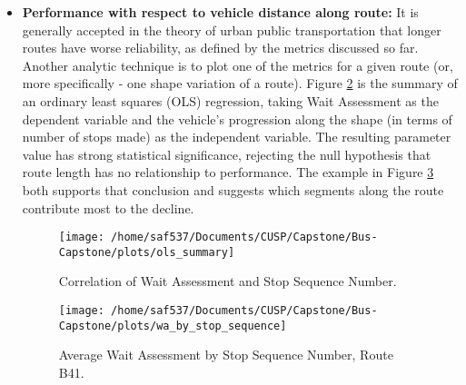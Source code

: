 \documentclass[12pt,journal,compsoc]{IEEEtran}
\begin{document}
\begin{itemize}
One example descriptive analysis is to plot the distribution of normalized running time variances. Visible in this example, Figure \ref{adh}, is both the central tendency -- slightly positive -- and the wide spread of the distribution, indicating very inconsistent running time adherence.  Strategies to reduce the inconsistency are not in the scope of this project.




\begin{figure}[!ht]
  \caption{Running time adherence.}
  \label{adh}
  \centering
    \texttt{[image: /home/saf537/Documents/CUSP/Capstone/Bus-Capstone/plots/running\_time\_adherence]}
\end{figure}


\item \textbf{Performance with respect to vehicle distance along route:} It is generally accepted in the theory of urban public transportation that longer routes have worse reliability, as defined by the metrics discussed so far.  Another analytic technique is to plot one of the metrics for a given route (or, more specifically - one shape variation of a route). Figure \ref{ols} is the summary of an ordinary least squares (OLS) regression, taking Wait Assessment as the dependent variable and the vehicle's progression along the shape (in terms of number of stops made) as the independent variable.  The resulting parameter value has strong statistical significance, rejecting the null hypothesis that route length has no relationship to performance.  The example in Figure \ref{wastop} both supports that conclusion and suggests which segments along the route contribute most to the decline.

\begin{figure}[!ht]
  \caption{Correlation of Wait Assessment and Stop Sequence Number.}
  \label{ols}
  \centering
    \texttt{[image: /home/saf537/Documents/CUSP/Capstone/Bus-Capstone/plots/ols\_summary]}
\end{figure}


\begin{figure}[!ht]
  \caption{Average Wait Assessment by Stop Sequence Number, Route B41.}
  \label{wastop}
  \centering
    \texttt{[image: /home/saf537/Documents/CUSP/Capstone/Bus-Capstone/plots/wa\_by\_stop\_sequence]}
\end{figure}


\end{itemize}
\end{document}
